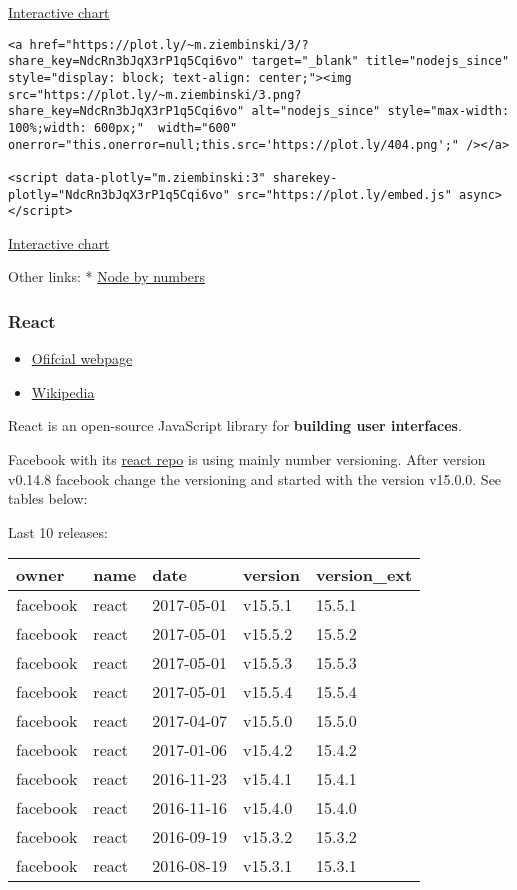 \href{https://plot.ly/~m.ziembinski/1/}{Interactive chart}

\begin{verbatim}
<a href="https://plot.ly/~m.ziembinski/3/?share_key=NdcRn3bJqX3rP1q5Cqi6vo" target="_blank" title="nodejs_since" style="display: block; text-align: center;"><img src="https://plot.ly/~m.ziembinski/3.png?share_key=NdcRn3bJqX3rP1q5Cqi6vo" alt="nodejs_since" style="max-width: 100%;width: 600px;"  width="600" onerror="this.onerror=null;this.src='https://plot.ly/404.png';" /></a>

<script data-plotly="m.ziembinski:3" sharekey-plotly="NdcRn3bJqX3rP1q5Cqi6vo" src="https://plot.ly/embed.js" async></script>
\end{verbatim}

\href{https://plot.ly/~m.ziembinski/3/}{Interactive chart}

Other links: * \href{https://nodesource.com/node-by-numbers}{Node by
numbers}

\hypertarget{react}{\subsubsection{React}\label{react}}

\begin{itemize}
\tightlist
\item
  \href{https://facebook.github.io/react/}{Ofifcial webpage}
\item
  \href{https://en.wikipedia.org/wiki/React_(JavaScript_library)}{Wikipedia}
\end{itemize}

React is an open-source JavaScript library for \textbf{building user
interfaces}.

Facebook with its \href{https://github.com/facebook/react}{react repo}
is using mainly number versioning. After version v0.14.8 facebook change
the versioning and started with the version v15.0.0. See tables below:

Last 10 releases:

\begin{longtable}[]{@{}lllll@{}}
\toprule
owner & name & date & version & version\_ext\tabularnewline
\midrule
\endhead
facebook & react & 2017-05-01 & v15.5.1 & 15.5.1\tabularnewline
facebook & react & 2017-05-01 & v15.5.2 & 15.5.2\tabularnewline
facebook & react & 2017-05-01 & v15.5.3 & 15.5.3\tabularnewline
facebook & react & 2017-05-01 & v15.5.4 & 15.5.4\tabularnewline
facebook & react & 2017-04-07 & v15.5.0 & 15.5.0\tabularnewline
facebook & react & 2017-01-06 & v15.4.2 & 15.4.2\tabularnewline
facebook & react & 2016-11-23 & v15.4.1 & 15.4.1\tabularnewline
facebook & react & 2016-11-16 & v15.4.0 & 15.4.0\tabularnewline
facebook & react & 2016-09-19 & v15.3.2 & 15.3.2\tabularnewline
facebook & react & 2016-08-19 & v15.3.1 & 15.3.1\tabularnewline
\bottomrule
\end{longtable}

